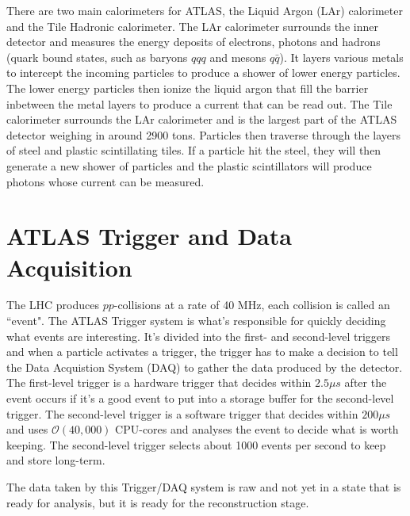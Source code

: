 There are two main calorimeters for ATLAS, the Liquid Argon (LAr) calorimeter and the Tile Hadronic calorimeter.
The LAr calorimeter surrounds the inner detector and measures the energy deposits of electrons, photons and hadrons (quark bound states, such as baryons $qqq$ and mesons $q\bar{q}$). 
It layers various metals to intercept the incoming particles to produce a shower of lower energy particles. 
The lower energy particles then ionize the liquid argon that fill the barrier inbetween the metal layers to produce a current that can be read out.
The Tile calorimeter surrounds the LAr calorimeter and is the largest part of the ATLAS detector weighing in around 2900 tons. 
Particles then traverse through the layers of steel and plastic scintillating tiles. 
If a particle hit the steel, they will then generate a new shower of particles and the plastic scintillators will produce photons whose current can be measured.

\section{ATLAS Trigger and Data Acquisition}

The LHC produces $pp$-collisions at a rate of 40 MHz, each collision is called an ``event". 
The ATLAS Trigger system is what's responsible for quickly deciding what events are interesting.
It's divided into the first- and second-level triggers and when a particle activates a trigger, the trigger has to make a decision to tell the Data Acquistion System (DAQ) to gather the data produced by the detector. 
The first-level trigger is a hardware trigger that decides within $2.5 \mu s$ after the event occurs if it's a good event to put into a storage buffer for the second-level trigger.
The second-level trigger is a software trigger that decides within $200 \mu s$ and uses $\mathcal{O}(40,000)$ CPU-cores and analyses the event to decide what is worth keeping. 
The second-level trigger selects about 1000 events per second to keep and store long-term. \cite{Trigger-DAQ}

The data taken by this Trigger/DAQ system is raw and not yet in a state that is ready for analysis, but it is ready for the reconstruction stage. 



